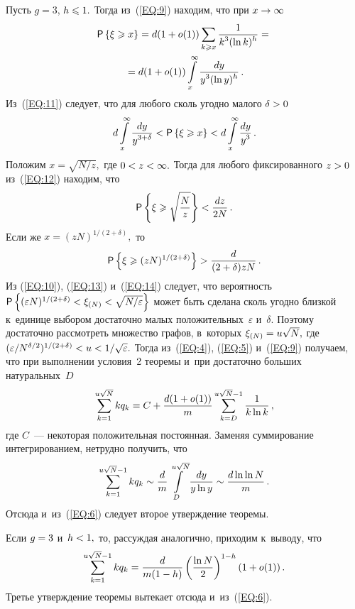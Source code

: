\begin{multicols}{2}
 Пусть $g=3$, $h\hm\leqslant 1.$ Тогда из~(\ref{EQ:9}) находим, что при 
 $x\hm\rightarrow \infty$
\begin{multline}
\label{EQ:11}
{\sf P}\left\{\xi\geqslant x\right\}=d(1+o(1))
\sum\limits_{k\geqslant x} 
\displaystyle\frac{\displaystyle 1\mathstrut}{\displaystyle k^3(\ln k)^h\mathstrut}={}\\
{}=d(1+o(1))\int\limits_x^\infty \displaystyle\frac{\displaystyle dy\mathstrut}{\displaystyle y^3(\ln y)^h\mathstrut}\,.
\end{multline}
Из~(\ref{EQ:11}) следует, что для любого сколь угодно малого $\delta\hm >0$
\begin{equation}
\label{EQ:12}
d\int\limits_x^\infty \displaystyle\frac{\displaystyle dy\mathstrut}{\displaystyle y^{3+\delta}\mathstrut} < {\sf P}\left\{\xi\geqslant x\right\} 
<d\int\limits_x^\infty \displaystyle\frac{\displaystyle dy\mathstrut}{\displaystyle y^3\mathstrut}\,.
\end{equation}
Положим $x=\sqrt{N/z},$ где $0\hm<z\hm<\infty.$ Тогда для любого фиксированного 
$z\hm>0$ из~(\ref{EQ:12}) находим, что
\begin{equation}
\label{EQ:13}
{\sf P}\left\{\xi\geqslant \sqrt{\displaystyle\frac{\displaystyle N\mathstrut}{\displaystyle z\mathstrut}}\right\}<\displaystyle\frac{\displaystyle dz\mathstrut}{\displaystyle 2N\mathstrut}\,.
\end{equation}
Если же $x=(zN)^{{1}/({2+\delta})},$ то
\begin{equation}
\label{EQ:14}
{\sf P}\left\{\xi\geqslant (zN)^{{1}/({2+\delta})}\right\}>\displaystyle\frac{\displaystyle d\mathstrut}{\displaystyle (2+\delta)zN\mathstrut}\,.
\end{equation}
Из (\ref{EQ:10}), (\ref{EQ:13}) и~(\ref{EQ:14}) следует, что вероятность
${\sf P}\left\{(\varepsilon N)^{{1}/({2+\delta})}<\xi_{(N)}\hm<\sqrt{{N}/{\varepsilon}}\right\}$
может быть сделана сколь угодно близкой к~единице 
выбором достаточно малых положительных~$\varepsilon$ и~$\delta.$ 
Поэтому достаточно рассмотреть множество графов, в~которых $\xi_{(N)}\hm=u\sqrt{N},$ 
где $(\varepsilon /N^{{\delta}/{2}})^{{1}/({2+\delta})}\hm<u\hm<1/\sqrt{\varepsilon}.$ 
Тогда из~(\ref{EQ:4}), (\ref{EQ:5}) и~(\ref{EQ:9}) 
получаем, что при выполнении условия~2 теоремы и~при достаточно больших 
натуральных~$D$
\begin{equation}
\label{EQ:15}
\sum\limits_{k=1}^{u\sqrt{N}} kq_k=C+\displaystyle\frac{\displaystyle d(1+o(1))\mathstrut}{\displaystyle m\mathstrut} 
\sum\limits_{k=D}^{u\sqrt{N}-1} \displaystyle\frac{\displaystyle 1\mathstrut}{\displaystyle k\ln k\mathstrut}\,,
\end{equation}
где $C$~--- некоторая положительная постоянная. 
Заменяя суммирование интегрированием, нетрудно получить, что
$$
\sum\limits_{k=1}^{u\sqrt{N}-1}kq_k \sim \displaystyle\frac{\displaystyle d\mathstrut}{\displaystyle m\mathstrut}
\int\limits_D^{u\sqrt{N}} \displaystyle\frac{\displaystyle dy\mathstrut}{\displaystyle y\ln y\mathstrut} \sim \displaystyle\frac{\displaystyle d\ln \ln N\mathstrut}{\displaystyle m\mathstrut}\,.
$$
Отсюда и~из~(\ref{EQ:6}) следует второе утверждение тео\-ремы.

Если $g\hm=3$ и~$h\hm<1,$ то, рассуждая аналогично, приходим к~выводу, что
$$
\sum\limits_{k=1}^{u\sqrt{N}-1} kq_k=\displaystyle\frac{\displaystyle d\mathstrut}{\displaystyle m(1-h)\mathstrut} 
\left(\displaystyle\frac{\displaystyle \ln N\mathstrut}{\displaystyle 2\mathstrut}\right)^{1-h}(1+o(1))\,.
$$
Третье утверждение теоремы вытекает отсюда и~из~(\ref{EQ:6}).


\end{multicols}
